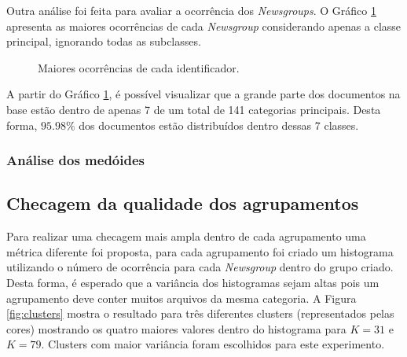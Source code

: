 \documentclass[conference]{IEEEtran}
\begin{document}
Outra análise foi feita para avaliar a ocorrência dos \emph{Newsgroups}. O Gráfico \ref{fig:occurrence_word} apresenta as maiores ocorrências de cada \emph{Newsgroup} considerando apenas a classe principal, ignorando todas as subclasses.

\begin{figure}[!h]
	\centering
	{
	}
	\caption{\small Maiores ocorrências de cada identificador.}
	\label{fig:occurrence_word}
\end{figure}

A partir do Gráfico \ref{fig:occurrence_word}, é possível visualizar que a grande parte dos documentos na base estão dentro de apenas 7 de um total de 141 categorias principais. Desta forma, $95.98\%$ dos documentos estão distribuídos dentro dessas 7 classes.

\subsubsection{Análise dos medóides}




\subsection{Checagem da qualidade dos agrupamentos}


Para realizar uma checagem mais ampla dentro de cada agrupamento uma métrica diferente foi proposta, para cada agrupamento foi criado um histograma utilizando o número de ocorrência para cada \emph{Newsgroup} dentro do grupo criado. Desta forma, é esperado que a variância dos histogramas sejam altas pois um agrupamento deve conter muitos arquivos da mesma categoria. A Figura \ref{fig:clusters} mostra o resultado para três diferentes clusters (representados pelas cores) mostrando os quatro maiores valores dentro do histograma para $K = 31$ e $K = 79$. Clusters com maior variância foram escolhidos para este experimento.
\end{document}
